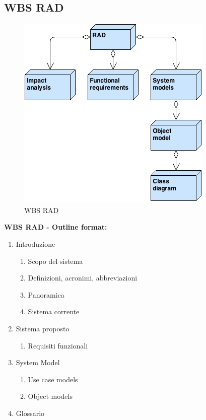 \subsection{WBS RAD}
\begin{figure}[ht]
\centering
\includegraphics[width=.5\textwidth]{img/wbs_rad.png}
\caption{WBS RAD} 
\end{figure}
\textbf{WBS RAD - Outline format:}
\begin{enumerate}
\item Introduzione
\begin{enumerate}[label*=\arabic*.]
\item Scopo del sistema
\item Definizioni, acronimi, abbreviazioni
\item Panoramica
\item Sistema corrente
\end{enumerate}
\item Sistema proposto
\begin{enumerate}[label*=\arabic*.]
\item Requisiti funzionali
\end{enumerate}
\item System Model
\begin{enumerate}[label*=\arabic*.]
\item Use case models
\item Object models
\end{enumerate}
\item Glossario
\end{enumerate}
\clearpage

